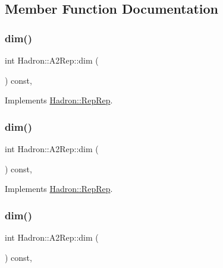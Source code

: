 \subsection{Member Function Documentation}
\mbox{\label{structHadron_1_1A2Rep_a17b15564f35f6be6afa4a189806da16b}} 
\subsubsection{\texorpdfstring{dim()}{dim()}\hspace{0.1cm}{\footnotesize\ttfamily [1/5]}}
{\footnotesize\ttfamily int Hadron\+::\+A2\+Rep\+::dim (\begin{DoxyParamCaption}{ }\end{DoxyParamCaption}) const\hspace{0.3cm}{\ttfamily [inline]}, {\ttfamily [virtual]}}



Implements \mbox{\hyperlink{structHadron_1_1RepRep_a92c8802e5ed7afd7da43ccfd5b7cd92b}{Hadron\+::\+Rep\+Rep}}.

\mbox{\label{structHadron_1_1A2Rep_a17b15564f35f6be6afa4a189806da16b}} 
\subsubsection{\texorpdfstring{dim()}{dim()}\hspace{0.1cm}{\footnotesize\ttfamily [2/5]}}
{\footnotesize\ttfamily int Hadron\+::\+A2\+Rep\+::dim (\begin{DoxyParamCaption}{ }\end{DoxyParamCaption}) const\hspace{0.3cm}{\ttfamily [inline]}, {\ttfamily [virtual]}}



Implements \mbox{\hyperlink{structHadron_1_1RepRep_a92c8802e5ed7afd7da43ccfd5b7cd92b}{Hadron\+::\+Rep\+Rep}}.

\mbox{\label{structHadron_1_1A2Rep_a17b15564f35f6be6afa4a189806da16b}} 
\subsubsection{\texorpdfstring{dim()}{dim()}\hspace{0.1cm}{\footnotesize\ttfamily [3/5]}}
{\footnotesize\ttfamily int Hadron\+::\+A2\+Rep\+::dim (\begin{DoxyParamCaption}{ }\end{DoxyParamCaption}) const\hspace{0.3cm}{\ttfamily [inline]}, {\ttfamily [virtual]}}




